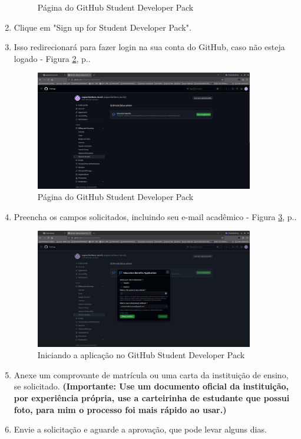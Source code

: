 \begin{enumerate}
\begin{figure}[H]
    \caption{Página do GitHub Student Developer Pack}
    \label{fig:github_student}
  \end{figure}
  \item Clique em "Sign up for Student Developer Pack".
  \item Isso redirecionará para fazer login na sua conta do GitHub, caso não esteja logado - Figura \ref{fig:github_student_developer_pack}, p.\pageref{fig:github_student_developer_pack}.
  \begin{figure}[H]
    \centering
    \includegraphics[width=0.9\textwidth]{./assets/images/05_application_page.png}
    \caption{Página do GitHub Student Developer Pack}
    \label{fig:github_student_developer_pack}
  \end{figure} 
  \item Preencha os campos solicitados, incluindo seu e-mail acadêmico - Figura \ref{fig:application_start}, p.\pageref{fig:application_start}.
  \begin{figure}[H]
    \centering
    \includegraphics[width=0.9\textwidth]{./assets/images/06_start_application.png}
    \caption{Iniciando a aplicação no GitHub Student Developer Pack}
    \label{fig:application_start}
  \end{figure}
  \item Anexe um comprovante de matrícula ou uma carta da instituição de ensino, se solicitado. \textbf{(Importante: Use um documento oficial da instituição, por experiência própria, use a carteirinha de estudante que possui foto, para mim o processo foi mais rápido ao usar.)}
  \item Envie a solicitação e aguarde a aprovação, que pode levar alguns dias.
\end{enumerate}
\par